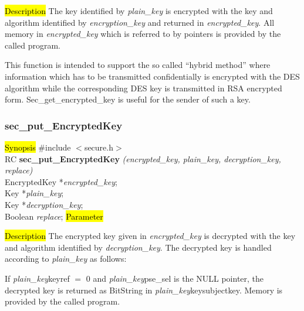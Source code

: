 

\hl{Description}
The key identified by {\em plain\_key} is encrypted with the key and algorithm identified by
{\em encryption\_key} and returned in 
{\em encrypted\_key}. All memory in {\em encrypted\_key} which is referred to by pointers
is provided by the called program. 

This function is intended to support the so called ``hybrid method'' where information which
has to be transmitted confidentially is encrypted with the DES algorithm while the corresponding DES key
is transmitted in RSA encrypted form. Sec\_get\_encrypted\_key is useful for the sender
of such a key.

\subsubsection{sec\_put\_EncryptedKey}
\label{sec_put_decr_key}
\hl{Synopsis}
\#include $<$secure.h$>$ \\ [0.5cm]
RC {\bf sec\_put\_EncryptedKey} {\em (encrypted\_key, plain\_key, decryption\_key, replace)} \\
EncryptedKey *{\em encrypted\_key}; \\
Key *{\em plain\_key}; \\
Key *{\em decryption\_key}; \\
Boolean {\em replace};
\hl{Parameter}




\hl{Description}
The encrypted key given in {\em encrypted\_key} is decrypted with the key and algorithm identified by
{\em decryption\_key}. The decrypted key is handled according to {\em plain\_key} as follows: 

If {\em plain\_key}\pf keyref $=$ 0 and {\em plain\_key}\pf pse\_sel is the NULL pointer, the decrypted key is
returned as BitString in {\em plain\_key}\pf key\pf subjectkey. Memory is provided by the called program. 

